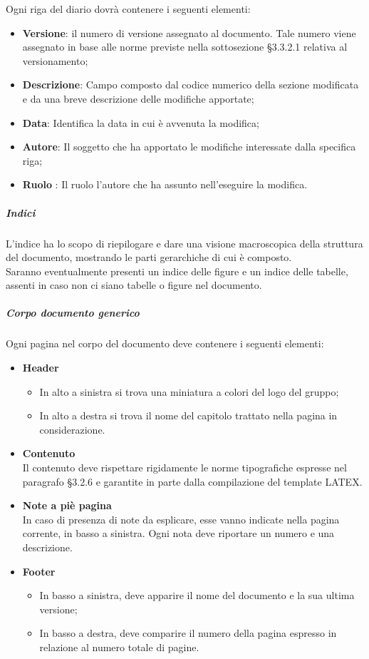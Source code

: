 					Ogni riga del diario dovrà contenere i seguenti elementi: \\
					\begin{itemize}
						\item\textbf{Versione}: il numero di versione assegnato al documento. Tale numero viene assegnato in base alle norme previste nella sottosezione §3.3.2.1 relativa al versionamento;
						\item\textbf{Descrizione}: Campo composto dal codice numerico della sezione modificata e da una breve descrizione delle modifiche apportate;
						\item\textbf{Data}: Identifica la data in cui è avvenuta la modifica;
						\item\textbf{Autore}: Il soggetto che ha apportato le modifiche interessate dalla specifica riga;
						\item\textbf{Ruolo} : Il ruolo l’autore che ha assunto nell’eseguire la modifica.
					\end{itemize}
				\subparagraph{Indici}
					L’indice ha lo scopo di riepilogare e dare una visione macroscopica della struttura del documento, mostrando le parti gerarchiche di cui è composto. \\
					Saranno eventualmente presenti un indice delle figure e un indice delle tabelle, assenti in caso non ci siano tabelle o figure nel documento.
				\subparagraph{Corpo documento generico}
					Ogni pagina nel corpo del documento deve contenere i seguenti elementi:\\
					\begin{itemize}
						\item\textbf{Header}
							\begin{itemize} 
								\item In alto a sinistra si trova una miniatura a colori del logo del gruppo;
								\item In alto a destra si trova il nome del capitolo trattato nella pagina in considerazione.
							\end{itemize}
						\item\textbf{Contenuto} \\
							Il contenuto deve rispettare rigidamente le norme tipografiche espresse nel paragrafo §3.2.6 e garantite in parte dalla compilazione del template LATEX.
						\item\textbf{Note a piè pagina} \\
							In caso di presenza di note da esplicare, esse vanno indicate nella pagina corrente, in basso a sinistra. Ogni nota deve riportare un numero e una descrizione.
						\item\textbf{Footer}
							\begin{itemize} 
								\item In basso a sinistra, deve apparire il nome del documento e la sua ultima versione;
								\item In basso a destra, deve comparire il numero della pagina espresso in relazione al numero totale di pagine.
							\end{itemize}
					\end{itemize}
